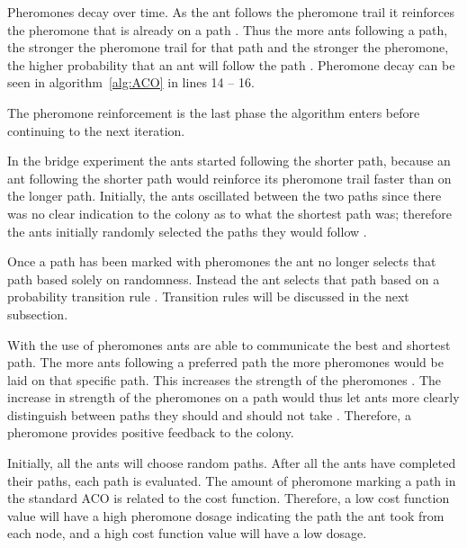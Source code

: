 Pheromones decay over time. As the ant follows the pheromone trail it reinforces the pheromone that is already on a path \cite{AntQAP}. Thus the more ants following a path, the stronger the pheromone trail for that path and the stronger the pheromone, the higher probability that an ant will follow the path \cite{AntQAP}. Pheromone decay can be seen in algorithm~\ref{alg:ACO} in lines 14 -- 16.

The pheromone reinforcement is the last phase the algorithm enters before continuing to the next iteration.

In the bridge experiment the ants started following the shorter path, because an ant following the shorter path would reinforce its pheromone trail faster than on the longer path. Initially, the ants oscillated between the two paths since there was no clear indication to the colony as to what the shortest path was; therefore the ants initially randomly selected the paths they would follow \cite{AntQAP}.

Once a path has been marked with pheromones the ant no longer selects that path based solely on randomness\cite{AntQAP,AntsAndStigmergy,CompuIntelligenceIntro}. Instead the ant selects that path based on a probability transition rule \cite{AntsAndStigmergy}. Transition rules will be discussed in the next subsection.

With the use of pheromones ants are able to communicate the best and shortest path\cite{AntQAP,AntsAndStigmergy,CompuIntelligenceIntro}. The more ants following a preferred path the more pheromones would be laid on that specific path. This increases the strength of the pheromones \cite{ImpACOComplex}. The increase in strength of the pheromones on a path would thus let ants more clearly distinguish between paths they should and should not take \cite{ImpACOComplex}. Therefore, a pheromone provides positive feedback to the colony\cite{AntQAP,AntsAndStigmergy,CompuIntelligenceIntro}.

Initially, all the ants will choose random paths\cite{AntQAP,AntsAndStigmergy,CompuIntelligenceIntro}. After all the ants have completed their paths, each path is evaluated\cite{CompuIntelligenceIntro}. The amount of pheromone marking a path in the standard ACO is related to the cost function\cite{AntQAP,AntsAndStigmergy,CompuIntelligenceIntro}. Therefore, a low cost function value will have a high pheromone dosage indicating the path the ant took from each node, and a high cost function value will have a low dosage\cite{CompuIntelligenceIntro}. 

